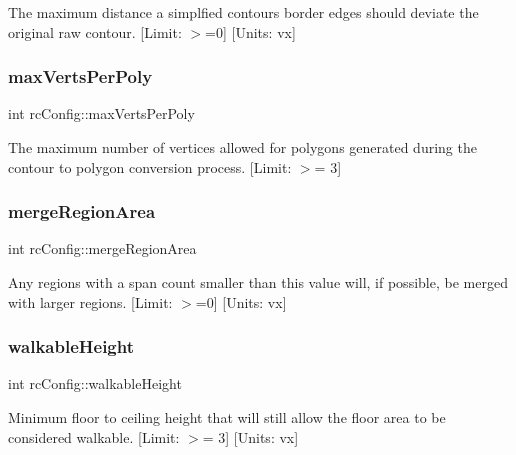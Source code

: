 The maximum distance a simplfied contour\textquotesingle{}s border edges should deviate the original raw contour. \mbox{[}Limit\+: $>$=0\mbox{]} \mbox{[}Units\+: vx\mbox{]} \mbox{\label{structrcConfig_a14739e425b85fde1d8216d32389ff89a}} 
\subsubsection{\texorpdfstring{max\+Verts\+Per\+Poly}{maxVertsPerPoly}}
{\footnotesize\ttfamily int rc\+Config\+::max\+Verts\+Per\+Poly}

The maximum number of vertices allowed for polygons generated during the contour to polygon conversion process. \mbox{[}Limit\+: $>$= 3\mbox{]} \mbox{\label{structrcConfig_ab1cb7148f953228fcab32f4cadd69f0a}} 
\subsubsection{\texorpdfstring{merge\+Region\+Area}{mergeRegionArea}}
{\footnotesize\ttfamily int rc\+Config\+::merge\+Region\+Area}

Any regions with a span count smaller than this value will, if possible, be merged with larger regions. \mbox{[}Limit\+: $>$=0\mbox{]} \mbox{[}Units\+: vx\mbox{]} \mbox{\label{structrcConfig_ab965b5f2aaa0b1ee7f91b28ead07c8c7}} 
\subsubsection{\texorpdfstring{walkable\+Height}{walkableHeight}}
{\footnotesize\ttfamily int rc\+Config\+::walkable\+Height}

Minimum floor to \textquotesingle{}ceiling\textquotesingle{} height that will still allow the floor area to be considered walkable. \mbox{[}Limit\+: $>$= 3\mbox{]} \mbox{[}Units\+: vx\mbox{]} \mbox{\label{structrcConfig_a85f1ff0f181cc33a3cc137cbd025c216}} 
